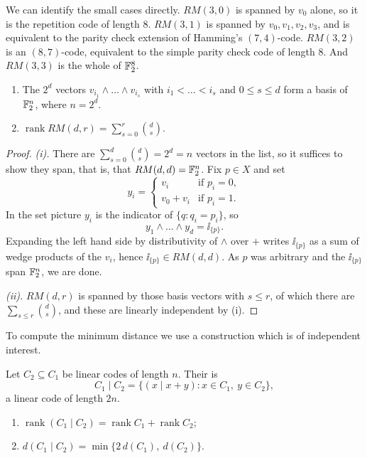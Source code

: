 \documentclass[a4paper]{scrartcl}
\DeclareMathOperator{\rank}{rank}
\begin{document}
We can identify the small cases directly. $RM(3,0)$ is spanned by $v_0$ alone, so it is the repetition code of length $8$. $RM(3,1)$ is spanned by $v_0,v_1,v_2,v_3$, and is equivalent to the parity check extension of Hamming's $(7,4)$-code. $RM(3,2)$ is an $(8,7)$-code, equivalent to the simple parity check code of length $8$. And $RM(3,3)$ is the whole of $\mathbb{F}_2^8$.

\begin{theorem}\label{thm:rmrank}
	\begin{enumerate}[label=(\roman*)]
		\item The $2^d$ vectors $v_{i_1}\wedge\dots\wedge v_{i_s}$ with $i_1<\dots<i_s$ and $0 \le s \le d$ form a basis of $\mathbb{F}_2^n$, where $n = 2^d$.
		\item $\rank RM(d,r) = \sum_{s=0}^r \binom ds$.
	\end{enumerate}
\end{theorem}

\begin{proof}
	\emph{(i).} There are $\sum_{s=0}^d\binom ds = 2^d = n$ vectors in the list, so it suffices to show they span, that is, that $RM(d,d) = \mathbb{F}_2^n$. Fix $p \in X$ and set
	$$y_i = \begin{cases} v_i & \text{if } p_i = 0,\\ v_0+v_i & \text{if } p_i = 1.\end{cases}$$
	In the set picture $y_i$ is the indicator of $\{q : q_i = p_i\}$, so
	$$y_1 \wedge \dots \wedge y_d = \ii_{\{p\}}.$$
	Expanding the left hand side by distributivity of $\wedge$ over $+$ writes $\ii_{\{p\}}$ as a sum of wedge products of the $v_i$, hence $\ii_{\{p\}} \in RM(d,d)$. As $p$ was arbitrary and the $\ii_{\{p\}}$ span $\mathbb{F}_2^n$, we are done.

	\emph{(ii).} $RM(d,r)$ is spanned by those basis vectors with $s \le r$, of which there are $\sum_{s\le r}\binom ds$, and these are linearly independent by (i).
\end{proof}

To compute the minimum distance we use a construction which is of independent interest.

\begin{definition}
	Let $C_2 \subseteq C_1$ be linear codes of length $n$. Their  is
	$$C_1 \mid C_2 = \{(x \mid x+y) : x \in C_1,\ y \in C_2\},$$
	a linear code of length $2n$.
\end{definition}

\begin{lemma}\label{lem:barprod}
	\begin{enumerate}[label=(\roman*)]
		\item $\rank(C_1\mid C_2) = \rank C_1 + \rank C_2$;
		\item $d(C_1\mid C_2) = \min\{2\,d(C_1),\ d(C_2)\}$.
	\end{enumerate}
\end{lemma}
\end{document}
